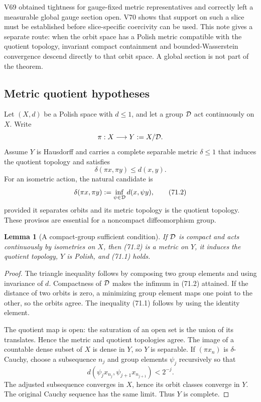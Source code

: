 \documentclass[11pt]{article}
\newtheorem{lemma}[theorem]{Lemma}
\theoremstyle{remark}
\begin{document}
V69 obtained tightness for gauge-fixed metric representatives and
correctly left a measurable global gauge section open.  V70 shows
that support on such a slice must be established before slice-specific
coercivity can be used.  This note gives a separate route: when the
orbit space has a Polish metric compatible with the quotient
topology, invariant compact containment and bounded-Wasserstein
convergence descend directly to that orbit space.  A global section
is not part of the theorem.

\subsection{Metric quotient hypotheses}

Let \((X,d)\) be a Polish space with \(d\leq1\), and let a group
\({\cal D}\) act continuously on \(X\).  Write
\[
                         \pi:X\longrightarrow Y:=X/{\cal D}.
\]
Assume \(Y\) is Hausdorff and carries a complete separable metric
\(\delta\leq1\) that induces the quotient topology and satisfies
\begin{equation}
                 \delta(\pi x,\pi y)\leq d(x,y).              \tag{71.1}
\end{equation}
For an isometric action, the natural candidate is
\[
 \delta(\pi x,\pi y)
 :=\inf_{\psi\in{\cal D}}d(x,\psi y),                         \tag{71.2}
\]
provided it separates orbits and its metric topology is the quotient
topology.  These provisos are essential for a noncompact
diffeomorphism group.

\begin{lemma}[A compact-group sufficient condition]
\label{lem:v12v71-compact-group}
If \({\cal D}\) is compact and acts continuously by isometries on
\(X\), then (71.2) is a metric on \(Y\), it induces the quotient
topology, \(Y\) is Polish, and (71.1) holds.
\end{lemma}

\begin{proof}
The triangle inequality follows by composing two group elements and
using invariance of \(d\).  Compactness of \({\cal D}\) makes the
infimum in (71.2) attained.  If the distance of two orbits is zero,
a minimizing group element maps one point to the other, so the
orbits agree.  The inequality (71.1) follows by using the identity
element.

The quotient map is open: the saturation of an open set is the
union of its translates.  Hence the metric and quotient topologies
agree.  The image of a countable dense subset of \(X\) is dense in
\(Y\), so \(Y\) is separable.  If \((\pi x_n)\) is
\(\delta\)-Cauchy, choose a subsequence \(n_j\) and group elements
\(\psi_j\) recursively so that
\[
 d(\psi_jx_{n_j},\psi_{j+1}x_{n_{j+1}})<2^{-j}.
\]
The adjusted subsequence converges in \(X\), hence its orbit classes
converge in \(Y\).  The original Cauchy sequence has the same limit.
Thus \(Y\) is complete.
\end{proof}
\end{document}
